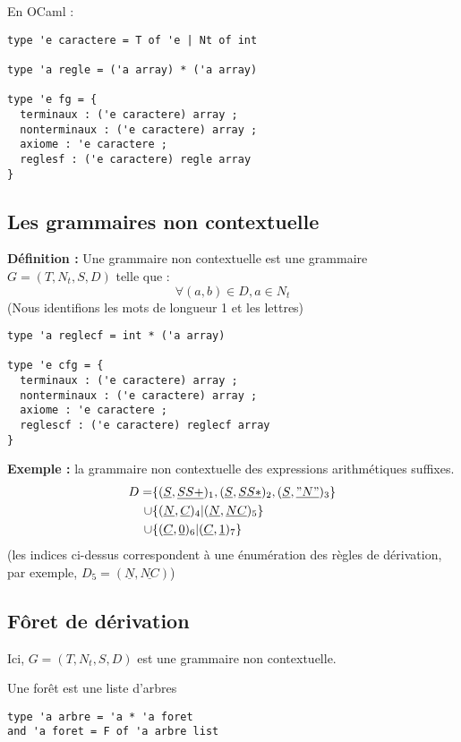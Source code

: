 \documentclass[a4paper,12pt]{article}
\begin{document}
En OCaml :
{\color{DarkBlue}\begin{verbatim}
type 'e caractere = T of 'e | Nt of int

type 'a regle = ('a array) * ('a array)

type 'e fg = {
  terminaux : ('e caractere) array ;
  nonterminaux : ('e caractere) array ;
  axiome : 'e caractere ;
  reglesf : ('e caractere) regle array
} 
\end{verbatim}}
\subsection{Les grammaires non contextuelle}

\textbf{  Définition : } Une grammaire non contextuelle est une grammaire $G = (T,N_t,S,D)$ telle que :
\begin{equation*} \forall (a,b) \in D, a \in N_t  \end{equation*}
(Nous identifions les mots de longueur 1 et les lettres)

{\color{DarkBlue}\begin{verbatim}
type 'a reglecf = int * ('a array)

type 'e cfg = {
  terminaux : ('e caractere) array ;
  nonterminaux : ('e caractere) array ;
  axiome : 'e caractere ;
  reglescf : ('e caractere) reglecf array
}
\end{verbatim}}

\textbf{ Exemple : } la grammaire non contextuelle des expressions arithmétiques suffixes.
\begin{align*}
D = &\{(\underline{ S },\underline{ SS+ })_1,(\underline{ S },\underline{ SS* })_2,(\underline{ S },\underline{ "N" })_3\}\\
\cup&\{(\underline{ N },\underline{ C })_4 | (\underline{ N },\underline{ NC })_5\}\\
\cup&\{(\underline{ C },\underline{ 0 })_6 | (\underline{ C },\underline{  1 })_7\}
\end{align*}
(les indices ci-dessus correspondent à une énumération des règles de dérivation, par exemple, $D_5 = (\underline{ N },\underline{ NC })$)

\subsection{Fôret de dérivation}

Ici, $G = (T,N_t,S,D)$ est une grammaire non contextuelle.

Une forêt est une liste d'arbres
{\color{DarkBlue}\begin{verbatim}
type 'a arbre = 'a * 'a foret 
and 'a foret = F of 'a arbre list
\end{verbatim}}
\end{document}
